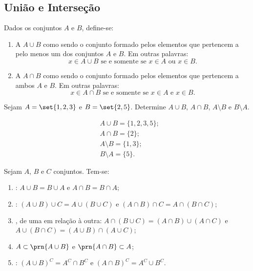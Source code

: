 \subsection{União e Interseção}

\begin{definition}
Dados os conjuntos $A$ e $B$, define-se:
%
\begin{enumerate}
	\item A  $A \cup B$ como sendo o conjunto formado pelos elementos que pertencem a pelo menos um dos conjuntos $A$ e $B$. Em outras palavras:
		$$ x \in A \cup B \text{ se e somente se } x \in A \text{ ou } x \in B. $$
	\item A  $A \cap B$ como sendo o conjunto formado pelos elementos que pertencem a ambos $A$ e $B$. Em outras palavras:
		$$ x \in A \cap B \text{ se e somente se } x \in A \text{ e } x \in B. $$
\end{enumerate}
\end{definition}

\begin{example}
Sejam $A = \set{1, 2, 3}$ e $ B = \set{2,5}$. Determine $A \cup B$, $A \cap B$, $A \setminus B$ e $B \setminus A$.
\end{example}

\begin{solution}
\begin{align*}
	&A \cup B = \{1,2,3,5\};\\
	&A \cap B = \{2\};\\
	&A \setminus B = \{1,3\};\\
	&B \setminus A = \{5\}.
\end{align*}
\end{solution}

\begin{proposition}
Sejam $A$, $B$ e $C$ conjuntos. Tem-se:
\begin{enumerate}
  \item {}: $A \cup B = B \cup A$ e $A \cap B = B \cap A$;
  \item {}: $\left(A \cup B \right) \cup C = A
  \cup \left( B \cup C \right)$ e $\left(A \cap B \right) \cap C = A
  \cap \left( B \cap C \right)$;
  \item {}, de uma em relação à outra: $A \cap
  \left( B \cup C \right) = \left(A \cap B \right) \cup \left( A \cap C
  \right)$ e $A \cup \left( B \cap C \right) = \left(A \cup B \right) \cap
  \left( A \cup C  \right)$;
  \item $A \subset \prn{A \cup B}$ e $\prn{A \cap B} \subset A$;
  \item {}: $\left( A \cup B \right)^C = A^C \cap
  B^C$ e $\left(A \cap B \right)^C = A^C \cup B^C$.

  \end{enumerate}
\end{proposition}

